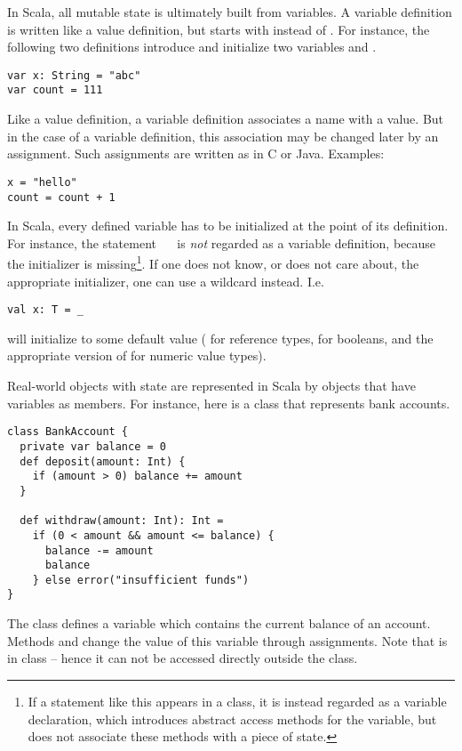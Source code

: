 {In Scala, all mutable state is ultimately built from variables.  A
variable definition is written like a value definition, but starts
with \verb@var@ instead of \verb@val@. For instance, the following two
definitions introduce and initialize two variables  and
.
\begin{lstlisting}
var x: String = "abc"
var count = 111
\end{lstlisting}
Like a value definition, a variable definition associates a name with
a value. But in the case of a variable definition, this association
may be changed later by an assignment.  Such assignments are written
as in C or Java. Examples:
\begin{lstlisting}
x = "hello"
count = count + 1
\end{lstlisting}
In Scala, every defined variable has to be initialized at the point of
its definition. For instance, the statement ~~ is
{\em not} regarded as a variable definition, because the initializer
is missing\footnote{If a statement like this appears in a class, it is
instead regarded as a variable declaration, which introduces
abstract access methods for the variable, but does not associate these
methods with a piece of state.}. If one does not know, or does not
care about, the appropriate initializer, one can use a wildcard
instead. I.e.
\begin{lstlisting}
val x: T = _
\end{lstlisting}
will initialize  to some default value ( for
reference types,  for booleans, and the appropriate
version of  for numeric value types).

Real-world objects with state are represented in Scala by objects that
have variables as members. For instance, here is a class that
represents bank accounts.
\begin{lstlisting}
class BankAccount {
  private var balance = 0
  def deposit(amount: Int) {
    if (amount > 0) balance += amount
  }

  def withdraw(amount: Int): Int =
    if (0 < amount && amount <= balance) {
      balance -= amount
      balance
    } else error("insufficient funds")
}
\end{lstlisting}
The class defines a variable  which contains the current
balance of an account. Methods  and 
change the value of this variable through assignments.  Note that
 is  in class  -- hence
it can not be accessed directly outside the class.

}
